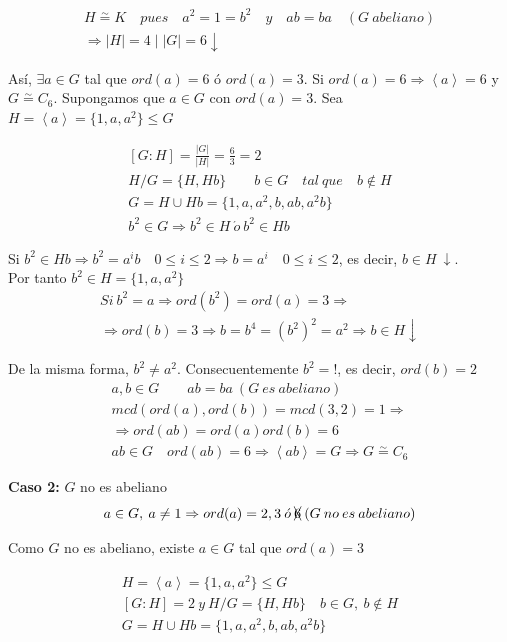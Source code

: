 \documentclass{article}
\begin{document}
\begin{enumerate}[(1)]
\begin{gather*}
H\overset{\sim}{=}K \quad pues \quad a^2=1=b^2 \quad y \quad ab=ba \quad(G\:abeliano) \\
\Rightarrow |H|=4\mid |G|=6 \downarrow
\end{gather*}

Así, $\exists a\in G$ tal que $ord(a)=6$ ó $ord(a)=3$. Si $ord(a)=6\Rightarrow \left\langle a \right\rangle=6$ y $G\overset{\sim}{=} C_6$. Supongamos que $a\in G$ con $ord(a)=3$. Sea $H=\left\langle a \right\rangle=\{1,a,a^2\}\leq G$

\begin{gather*}
\left[G:H\right]=\frac{|G|}{|H|}=\frac{6}{3}=2 \\
H/G=\{H,Hb\} \qquad b\in G \quad tal\:que \quad b\notin H \\
G=H\cup Hb=\{1,a,a^2,b,ab,a^2b\} \\
b^2\in G\Rightarrow b^2\in H\:\acute{o}\:b^2\in Hb
\end{gather*}

Si $b^2\in Hb\Rightarrow b^2=a^ib\quad 0\leq i\leq 2\Rightarrow b=a^i \quad 0\leq i \leq 2$, es decir, $b\in H\:\downarrow$. \\

Por tanto $b^2\in H=\{1,a,a^2\}$
\begin{gather*}
Si\: b^2=a\Rightarrow ord(b^2)=ord(a)=3 \Rightarrow\\
\Rightarrow ord(b)=3 \Rightarrow b=b^4=(b^2)^2=a^2\Rightarrow b\in H \downarrow
\end{gather*}

De la misma forma, $b^2\neq a^2$. Consecuentemente $b^2=!$, es decir, $ord(b)=2$
\begin{gather*}
a,b\in G \qquad ab=ba\:(G\:es\:abeliano) \\
mcd(ord(a),ord(b))=mcd(3,2)=1 \Rightarrow \\
\Rightarrow ord(ab)=ord(a)ord(b)=6 \\
ab\in G \quad ord(ab)=6 \Rightarrow \left\langle ab\right\rangle=G\Rightarrow G\overset{\sim}{=}C_6
\end{gather*}

\textbf{Caso 2:} $G$ no es abeliano 
\begin{equation*}
a\in G,\:a\neq 1\Rightarrow ord(a)=2,3\:\acute{o}\:\xcancel{6}\:(G\:no\:es\:abeliano)
\end{equation*}

Como $G$ no es abeliano, existe $a\in G$ tal que $ord(a)=3$

\begin{gather*}
H=\left\langle a\right\rangle=\{1,a,a^2\} \leq G \\
\left[G:H\right]=2\:y\:H/G=\{H,Hb\}\quad b\in G,\:b\notin H \\
G=H\cup Hb=\{1,a,a^2,b,ab,a^2b\}
\end{gather*}


\end{enumerate}
\end{document}
